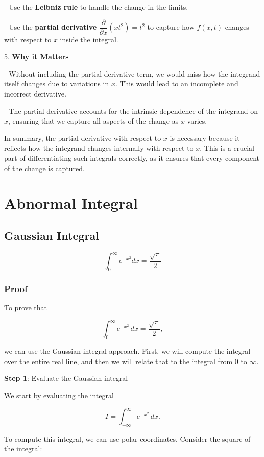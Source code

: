 \documentclass[a4paper,12pt]{book}
\begin{document}
- Use the \textbf{Leibniz rule} to handle the change in the limits.

- Use the \textbf{partial derivative} \(\dfrac{\partial}{\partial x} (xt^2) = t^2\) to capture how \( f(x, t) \) changes with respect to \( x \) inside the integral.

5. \textbf{Why it Matters}

- Without including the partial derivative term, we would miss how the integrand itself changes due to variations in \( x \). This would lead to an incomplete and incorrect derivative.

- The partial derivative accounts for the intrinsic dependence of the integrand on \( x \), ensuring that we capture all aspects of the change as \( x \) varies.

In summary, the partial derivative with respect to \( x \) is necessary because it reflects how the integrand changes internally with respect to \( x \). This is a crucial part of differentiating such integrals correctly, as it ensures that every component of the change is captured.

\chapter{Abnormal Integral}

\section{Gaussian Integral}

\[\int_0^\infty e^{-x^2} dx = \dfrac{\sqrt{\pi}}{2}\]

\subsection{Proof}

To prove that 

\[
\int_0^\infty e^{-x^2} \, dx = \dfrac{\sqrt{\pi}}{2},
\]

we can use the Gaussian integral approach. First, we will compute the integral over the entire real line, and then we will relate that to the integral from \(0\) to \(\infty\).

\textbf{Step 1}: Evaluate the Gaussian integral

We start by evaluating the integral 

\[
I = \int_{-\infty}^\infty e^{-x^2} \, dx.
\]

To compute this integral, we can use polar coordinates. Consider the square of the integral:
\end{document}
